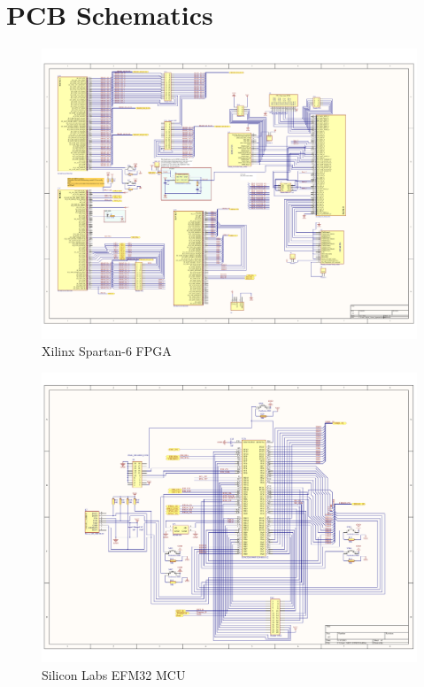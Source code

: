 \chapter{PCB Schematics}
\begin{figure}
    \includegraphics[width=\paperwidth, angle=90]{img/FPGA_Xilinx_Spartan6.pdf}
    \caption{Xilinx Spartan-6 FPGA}
    \label{fig:FPGA_Xilinx_Spartan6}
\end{figure}

\begin{figure}
    \includegraphics[width=\paperwidth, angle=90]{img/MCU_EFM32.pdf}
    \caption{Silicon Labs EFM32 MCU}
    \label{fig:MCU_EFM32}
\end{figure}

